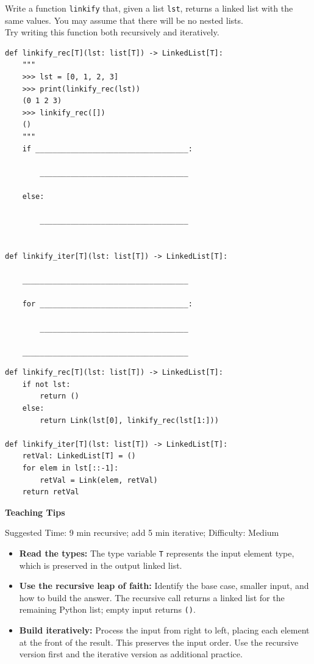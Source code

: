 \begin{blocksection}
\question Write a function \texttt{linkify} that, given a list \texttt{lst}, returns a linked list with the same values. You may assume that there will be no nested lists. \\

Try writing this function both recursively and iteratively. \\

\begin{lstlisting}
def linkify_rec[T](lst: list[T]) -> LinkedList[T]:
    """
    >>> lst = [0, 1, 2, 3]
    >>> print(linkify_rec(lst))
    (0 1 2 3)
    >>> linkify_rec([])
    ()
    """
    if ___________________________________:

        __________________________________

    else:

        __________________________________


def linkify_iter[T](lst: list[T]) -> LinkedList[T]:

    ______________________________________

    for __________________________________:

        __________________________________

    ______________________________________

\end{lstlisting}
\begin{solution}[1in]
\begin{lstlisting}
def linkify_rec[T](lst: list[T]) -> LinkedList[T]:
    if not lst:
        return ()
    else:
        return Link(lst[0], linkify_rec(lst[1:]))

def linkify_iter[T](lst: list[T]) -> LinkedList[T]:
    retVal: LinkedList[T] = ()
    for elem in lst[::-1]:
        retVal = Link(elem, retVal)
    return retVal
\end{lstlisting}
\end{solution}
\end{blocksection}

\begin{questionmeta}
\textbf{Teaching Tips}\par\nopagebreak[4]
Suggested Time: 9 min recursive; add 5 min iterative; Difficulty: Medium
\nopagebreak[4]
\begin{itemize}
    \item \textbf{Read the types:} The type variable \lstinline{T} represents
    the input element type, which is preserved in the output linked list.
    \item \textbf{Use the recursive leap of faith:} Identify the base case,
    smaller input, and how to build the answer. The recursive call returns
    a linked list for the remaining Python list; empty input returns
    \lstinline{()}.
    \item \textbf{Build iteratively:} Process the input from right to left,
    placing each element at the front of the result. This preserves the
    input order. Use the recursive version first and the iterative version
    as additional practice.
\end{itemize}
\end{questionmeta}
